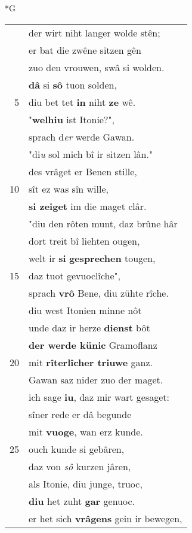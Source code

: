 \documentclass[8pt,a4paper,notitlepage]{article}
\begin{document}
\newpage
\begin{table}[ht]
\begin{minipage}[t]{0.5\linewidth}
\small
\begin{center}*G
\end{center}
\begin{tabular}{rl}
 & der wirt niht langer wolde stên;\\ 
 & er bat die zwêne sitzen gên\\ 
 & zuo den vrouwen, swâ si wolden.\\ 
 & \textbf{dâ} si \textbf{sô} tuon solden,\\ 
5 & diu bet tet \textbf{in} niht \textbf{ze} wê.\\ 
 & "\textbf{welhiu} ist Itonie?",\\ 
 & sprach d\textit{er} werde Gawan.\\ 
 & "di\textit{u} sol mich bî ir sitzen lân."\\ 
 & des vrâget er Benen stille,\\ 
10 & sît ez was sîn wille,\\ 
 & \textbf{si zeiget} im die maget clâr.\\ 
 & "diu den rôten munt, daz brûne hâr\\ 
 & dort treit bî liehten ougen,\\ 
 & welt ir \textbf{si} \textbf{gesprechen} tougen,\\ 
15 & daz tuot gevuoclîche",\\ 
 & sprach \textbf{vrô} Bene, diu zühte rîche.\\ 
 & diu west Itonien minne nôt\\ 
 & unde daz ir herze \textbf{dienst} bôt\\ 
 & \textbf{der werde künic} Gramoflanz\\ 
20 & mit \textbf{rîterlîcher triuwe} ganz.\\ 
 & Gawan saz nider zuo der maget.\\ 
 & ich sage \textbf{iu}, daz mir wart gesaget:\\ 
 & sîner rede er dâ begunde\\ 
 & mit \textbf{vuoge}, wan erz kunde.\\ 
25 & ouch kunde si gebâren,\\ 
 & daz von \textit{sô} kurzen jâren,\\ 
 & als Itonie, diu junge, truoc,\\ 
 & \textbf{diu} het zuht \textbf{gar} genuoc.\\ 
 & er het sich \textbf{vrâgens} gein ir bewegen,\\ 

\end{tabular}
\end{minipage}
\end{table}
\end{document}
